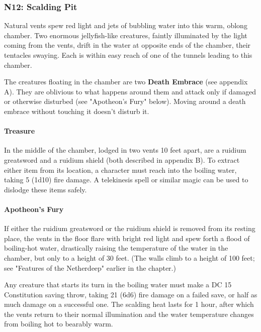 \documentclass[10pt,a4paper,twoside,bg=print,twocolumn,openany,nodeprecatedcode]{dndbook}
\begin{document}
\subsubsection{N12: Scalding Pit}
\begin{DndReadAloud}{}
Natural vents spew red light and jets of bubbling water into this warm, oblong chamber. Two enormous jellyfish-like creatures, faintly illuminated by the light coming from the vents, drift in the water at opposite ends of the chamber, their tentacles swaying. Each is within easy reach of one of the tunnels leading to this chamber.

\end{DndReadAloud}


The creatures floating in the chamber are two \textbf{Death Embrace} (see appendix A). They are oblivious to what happens around them and attack only if damaged or otherwise disturbed (see "Apotheon's Fury" below). Moving around a death embrace without touching it doesn't disturb it.

\paragraph{Treasure}
In the middle of the chamber, lodged in two vents 10 feet apart, are a ruidium greatsword and a ruidium shield (both described in appendix B). To extract either item from its location, a character must reach into the boiling water, taking 5 (1d10) fire damage. A telekinesis spell or similar magic can be used to dislodge these items safely.

\paragraph{Apotheon's Fury}
If either the ruidium greatsword or the ruidium shield is removed from its resting place, the vents in the floor flare with bright red light and spew forth a flood of boiling-hot water, drastically raising the temperature of the water in the chamber, but only to a height of 30 feet. (The walls climb to a height of 100 feet; see "Features of the Netherdeep" earlier in the chapter.)

Any creature that starts its turn in the boiling water must make a DC 15 Constitution saving throw, taking 21 (6d6) fire damage on a failed save, or half as much damage on a successful one. The scalding heat lasts for 1 hour, after which the vents return to their normal illumination and the water temperature changes from boiling hot to bearably warm.
\end{document}
